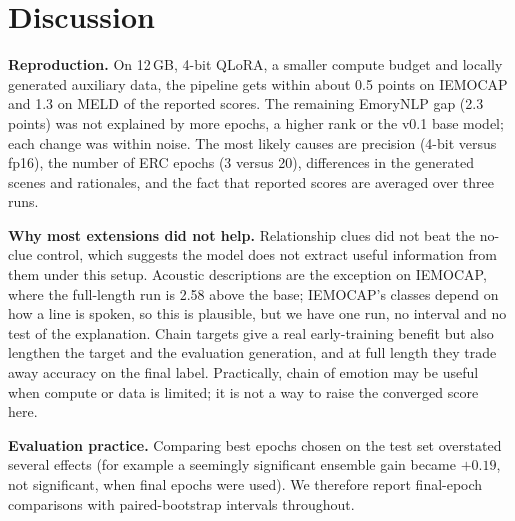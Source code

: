 \documentclass[lettersize,journal]{IEEEtran}
\begin{document}
\section{Discussion}
\textbf{Reproduction.} On 12\,GB, 4-bit QLoRA, a smaller compute budget and locally generated auxiliary data, the pipeline gets within about 0.5 points on IEMOCAP and 1.3 on MELD of the reported scores. The remaining EmoryNLP gap (2.3 points) was not explained by more epochs, a higher rank or the v0.1 base model; each change was within noise. The most likely causes are precision (4-bit versus fp16), the number of ERC epochs (3 versus 20), differences in the generated scenes and rationales, and the fact that reported scores are averaged over three runs.

\textbf{Why most extensions did not help.} Relationship clues did not beat the no-clue control, which suggests the model does not extract useful information from them under this setup. Acoustic descriptions are the exception on IEMOCAP, where the full-length run is 2.58 above the base; IEMOCAP's classes depend on how a line is spoken, so this is plausible, but we have one run, no interval and no test of the explanation. Chain targets give a real early-training benefit but also lengthen the target and the evaluation generation, and at full length they trade away accuracy on the final label. Practically, chain of emotion may be useful when compute or data is limited; it is not a way to raise the converged score here.

\textbf{Evaluation practice.} Comparing best epochs chosen on the test set overstated several effects (for example a seemingly significant ensemble gain became $+0.19$, not significant, when final epochs were used). We therefore report final-epoch comparisons with paired-bootstrap intervals throughout.

\end{document}
